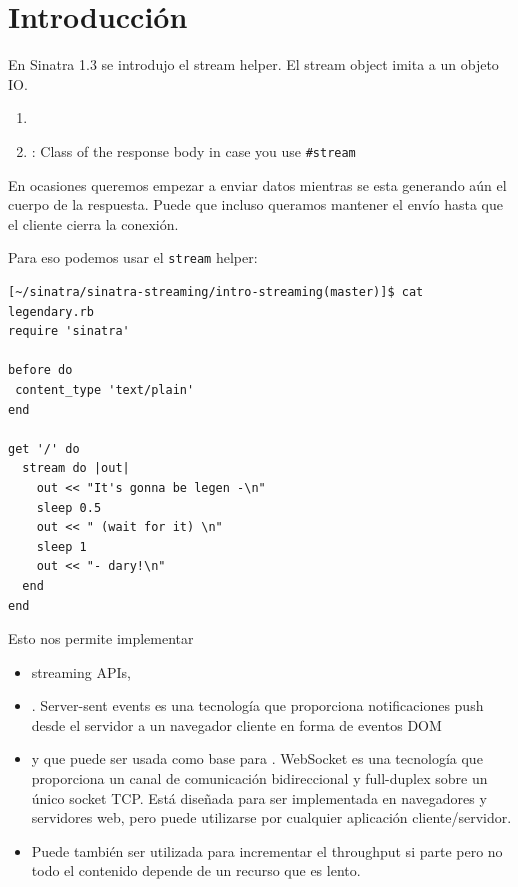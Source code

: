 \section{Introducción}
En Sinatra 1.3 se introdujo el stream helper. 
El stream object imita a un objeto IO.

\begin{enumerate}
\item 
{}
\item 
{}: Class of the response body in case you use \verb|#stream|
\end{enumerate}

En ocasiones queremos empezar a enviar datos mientras se esta generando aún el cuerpo de la 
respuesta.
Puede que incluso queramos mantener el envío hasta que el cliente cierra la conexión.

Para eso podemos usar el \verb|stream| helper:

\begin{verbatim}
[~/sinatra/sinatra-streaming/intro-streaming(master)]$ cat legendary.rb 
require 'sinatra'

before do
 content_type 'text/plain'
end

get '/' do
  stream do |out|
    out << "It's gonna be legen -\n"
    sleep 0.5
    out << " (wait for it) \n"
    sleep 1
    out << "- dary!\n"
  end
end
\end{verbatim}

Esto nos permite implementar 
\begin{itemize}
\item
streaming APIs,
\item
{}.
Server-sent events es una tecnología que proporciona notificaciones push desde el servidor a un 
navegador cliente en forma de eventos DOM
\item
y que 
puede ser usada como base para . WebSocket es una tecnología que proporciona un canal de comunicación bidireccional y full-duplex sobre un único socket TCP. Está diseñada para ser implementada en navegadores y servidores web, pero puede utilizarse por cualquier aplicación cliente/servidor.
\item
Puede también ser utilizada para incrementar el throughput si parte pero no todo el contenido depende
de un recurso que es lento.
\end{itemize}

